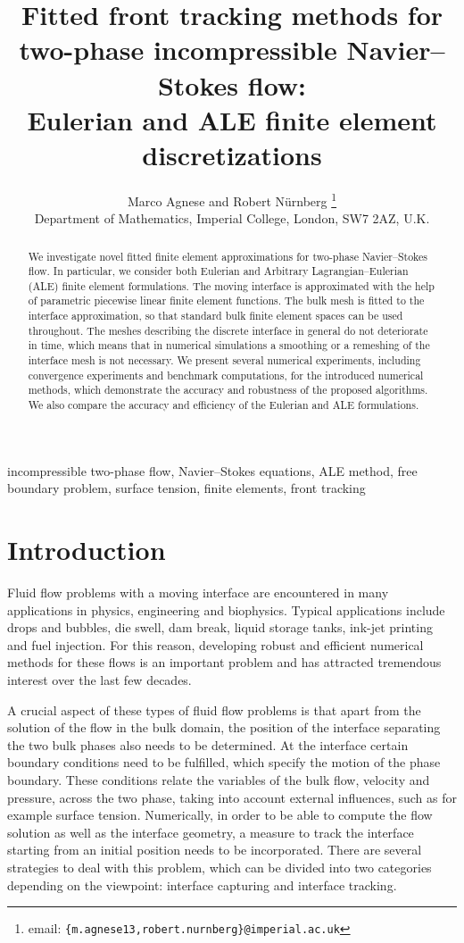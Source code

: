 \documentclass[a4paper,12pt,onecolumn]{article}
\title{Fitted front tracking methods for two-phase incompressible
Navier--Stokes flow: \\
Eulerian and ALE finite element discretizations
}
\author{Marco Agnese and Robert N\"urnberg%
\thanks{email: \texttt{\{m.agnese13,robert.nurnberg\}@imperial.ac.uk}}\\
\small
Department of Mathematics, Imperial College, London, SW7 2AZ, U.K.}
\date{}
\newenvironment{keywords}{{\upshape\bfseries Key words. }\ignorespaces}{}
\begin{document}
\captionsetup[subfigure]{labelformat=empty} %

\maketitle

\begin{abstract}
We investigate novel fitted finite element approximations for two-phase
Navier--Stokes flow. In particular, we consider both Eulerian and
Arbitrary Lagrangian--Eulerian (ALE) finite element formulations.
The moving interface is approximated with the help of
parametric piecewise linear
finite element functions. The bulk mesh is fitted to the interface
approximation, so that standard bulk finite element spaces can be used
throughout.
The meshes describing the discrete interface in
general do not deteriorate in time, which means that in numerical simulations a
smoothing or a remeshing of the interface mesh is not necessary.
We present several numerical experiments, including convergence experiments
and benchmark computations, for the introduced numerical methods,
which demonstrate the accuracy and robustness of the proposed algorithms.
We also compare the accuracy and efficiency of the Eulerian and ALE
formulations.
\end{abstract}

\begin{keywords}
incompressible two-phase flow, Navier--Stokes equations, ALE method,
free boundary problem, surface tension, finite elements, front tracking
\end{keywords}

\section{Introduction}\label{sec:introdution}
Fluid flow problems with a moving interface are encountered in many
applications in physics, engineering and biophysics. Typical applications
include drops and bubbles, die swell, dam break, liquid storage tanks,
ink-jet printing and fuel injection. For this reason, developing robust and
efficient numerical methods for these flows is an important problem and
has attracted tremendous interest over the last few decades.

A crucial aspect of these types of fluid flow problems is that apart from
the solution of the flow in the bulk domain, the position of the interface
separating the two bulk phases also needs to be determined.
At the interface certain boundary conditions need to be fulfilled, which
specify the motion of the phase boundary.
These conditions relate the variables of the bulk flow, velocity and pressure,
across the two phase, taking into account external influences, such as for
example surface tension. Numerically, in order
to be able to compute the flow solution as well as the interface
geometry, a measure to track the interface starting from an initial position
needs to be incorporated.
There are several strategies to deal with this problem, which can be divided
into two categories depending on the viewpoint: interface capturing and
interface tracking.
\end{document}
